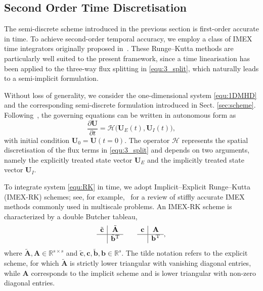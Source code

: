 \documentclass[a4paper,fleqn]{cas-sc}
\theoremstyle{definition}
\theoremstyle{remark}
\begin{document}
\subsection{Second Order Time Discretisation}


The semi-discrete scheme introduced in the previous section is
first-order accurate in time.
To achieve second-order temporal accuracy, we employ a class of IMEX time integrators originally
proposed in~\cite{RKIMEX}.
These Runge--Kutta methods are particularly well suited to the present
framework, since a time linearisation has been applied to the three-way
flux splitting in \eqref{equ:3_split}, which naturally leads to a semi-implicit
formulation.

Without loss of generality, we consider the one-dimensional
system \eqref{equ:1DMHD} and the corresponding semi-discrete formulation
introduced in Sect. \ref{sec:scheme}.
Following~\cite{RKIMEX}, the governing equations can be written in autonomous
form as
\begin{equation}
\frac{\partial \mathbf{U}}{\partial t}
=
\mathcal{H}\bigl(\mathbf{U}_E(t), \mathbf{U}_I(t)\bigr),
\label{equ:RK}
\end{equation}
with initial condition $\mathbf{U}_0 = \mathbf{U}(t=0)$.
The operator $\mathcal{H}$ represents the spatial discretisation of the
flux terms in \eqref{equ:3_split} and depends on two arguments, namely the explicitly
treated state vector $\mathbf{U}_E$ and the implicitly treated state
vector $\mathbf{U}_I$.

To integrate system \eqref{equ:RK} in time, we adopt Implicit--Explicit
Runge--Kutta (IMEX-RK) schemes; see, for example,~\cite{RKIMEX2} for a review
of stiffly accurate IMEX methods commonly used in multiscale problems.
An IMEX-RK scheme is characterized by a double Butcher tableau,
\begin{equation}
\begin{array}{c|c}
\tilde{\mathbf{c}} & \tilde{\mathbf{A}} \\
\hline
& \tilde{\mathbf{b}}^{\mathrm T}
\end{array}
\qquad
\begin{array}{c|c}
\mathbf{c} & \mathbf{A} \\
\hline
& \mathbf{b}^{\mathrm T}
\end{array},
\end{equation}
where $\tilde{\mathbf{A}}, \mathbf{A} \in \mathbb{R}^{s \times s}$ and
$\tilde{\mathbf{c}}, \mathbf{c}, \tilde{\mathbf{b}}, \mathbf{b}
\in \mathbb{R}^s$.
The tilde notation refers to the explicit scheme, for which
$\tilde{\mathbf{A}}$ is strictly lower triangular with vanishing diagonal
entries, while $\mathbf{A}$ corresponds to the implicit scheme and is
lower triangular with non-zero diagonal entries.
\end{document}
